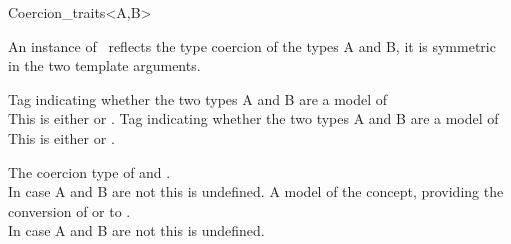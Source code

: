 \begin{ccRefClass}{Coercion_traits<A,B>}

\ccDefinition

An instance of \ccClassTemplateName\ reflects the type coercion of the types
{\sc A} and {\sc B}, it is symmetric in the two template arguments. 


\ccTypes


        { Tag indicating whether the two types A and B are a model of  \\
          This is either  or . }
        { Tag indicating whether the two types A and B are a model of  \\
          This is either  or . }

        {The coercion type of  and . \\
        In case A and B are not  this is undefined.  }
        {A model of the  concept, providing the conversion of  or  to . \\
        In case A and B are not  this is undefined.  }


\ccSeeAlso
{} \\
 \\
\end{ccRefClass} 